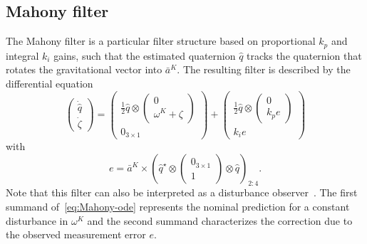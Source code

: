 \subsection{Mahony filter}
The Mahony filter is a particular filter structure based on proportional $k_p$ and integral $k_i$ gains, such that the estimated quaternion $\hat{q} $ tracks the quaternion that rotates the gravitational vector into $\bar{a}^K$.
The resulting filter is described by the differential equation~\cite{Mahony2008}
\begin{equation}\label{eq:Mahony-ode}
	\begin{pmatrix}
		\dot{\hat{q}}  \\
		\dot{\zeta}
	\end{pmatrix} 
	= 
	\begin{pmatrix}
		\frac{1}{2} \hat{q} \otimes \begin{pmatrix}0 \\ \omega^K + \zeta\end{pmatrix} \\
		0_{3\times 1}
	\end{pmatrix}+
	\begin{pmatrix}
		\frac{1}{2} \hat{q} \otimes \begin{pmatrix}0 \\ k_p e\end{pmatrix} \\
		k_i e
	\end{pmatrix}
\end{equation}
with
\begin{equation}
	e = \bar{a}^K \times  \left(\hat{q} ^\star \otimes \begin{pmatrix}0_{3\times1} \\ 1 \end{pmatrix} \otimes \hat{q} \right)_{2:4}.
\end{equation}
Note that this filter can also be interpreted as a disturbance observer~\cite{Andrievsky2020}.
The first summand of~\eqref{eq:Mahony-ode} represents the nominal prediction for a constant disturbance in $\omega^K$ and the second summand characterizes the correction due to the observed measurement error $e$.

